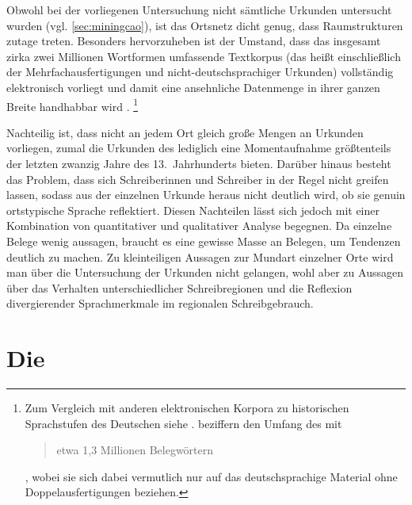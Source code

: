 Obwohl bei der vorliegenen Untersuchung nicht sämtliche Urkunden untersucht
wurden (vgl. \cref{sec:miningcao}), ist das Ortsnetz dicht genug, dass
Raumstrukturen zutage treten. Besonders hervorzuheben ist der Umstand, dass das
insgesamt zirka zwei Millionen Wortformen umfassende Textkorpus (das heißt
einschließlich der Mehrfachausfertigungen und nicht-deutschsprachiger Urkunden)
vollständig elektronisch vorliegt \autocites{gniffkerapp2005}{cao-online} und
damit eine ansehnliche Datenmenge in ihrer ganzen Breite handhabbar wird
\autocite{beckerschallert2021,beckerschallert2022b}.%
%
	\footnote{Zum Vergleich mit anderen elektronischen Korpora zu historischen
	Sprachstufen des Deutschen siehe \citet{dipper2015}.
	\citet[391]{gniffkerapp2005} beziffern den Umfang des \CAO{} mit
	\blockquote{etwa 1,3 Millionen Belegwörtern}, wobei sie sich dabei
	vermutlich nur auf das deutschsprachige Material ohne Doppelausfertigungen
	beziehen.} %

Nachteilig ist, dass nicht an jedem Ort gleich große Mengen an Urkunden
vorliegen, zumal die Urkunden des \CAO{} lediglich eine Momentaufnahme
größtenteils der letzten zwanzig Jahre des 13.~Jahrhunderts bieten. Darüber
hinaus besteht das Problem, dass sich Schreiberinnen und Schreiber in der Regel
nicht greifen lassen, sodass aus der einzelnen Urkunde heraus nicht deutlich
wird, ob sie genuin ortstypische Sprache reflektiert. Diesen Nachteilen lässt
sich jedoch mit einer Kombination von quantitativer und qualitativer Analyse
begegnen. Da einzelne Belege wenig aussagen, braucht es eine gewisse Masse an
Belegen, um Tendenzen deutlich zu machen.
Zu kleinteiligen Aus\-sagen zur Mundart einzelner Orte wird man über die
Untersuchung der Urkunden nicht gelangen, wohl aber zu Aussagen über das
Verhalten unterschiedlicher Schreibregionen und die Reflexion divergierender
Sprachmerkmale im regionalen Schreibgebrauch.


\section[Die \tit{Kaiserchronik}]{Die \KC{}}
\label{sec:materialkc}

